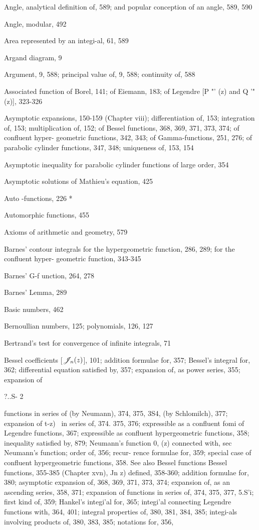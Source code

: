 Angle, analytical definition of, 589; and popular conception of an angle, 589, 590

Angle, modular, 492

Area represented by an integi-al, 61, 589

Argand diagram, 9

Argument, 9, 588; principal value of, 9, 588; continuity of, 588

Associated function of Borel, 141; of Eiemann, 183; of Legendre [P "' (z) and Q '" (z)], 323-326

Asymptotic expansions, 150-159 (Chapter viii); differentiation of, 153; integration of, 153;
multiplication of, 152; of Bessel functions, 368, 369, 371, 373, 374; of confluent hyper-
geometric functions, 342, 343; of Gamma-functions, 251, 276; of parabolic cylinder functions,
347, 348; uniqueness of, 153, 154

Asymptotic inequality for parabolic cylinder functions of large order, 354

Asymptotic solutions of Mathieu's equation, 425

Auto -functions, 226 *

Automorphic functions, 455

Axioms of arithmetic and geometry, 579

Barnes' contour integrals for the hypergeometric function, 286, 289; for the confluent hyper-
geometric function, 343-345

Barnes' G-f unction, 264, 278

Barnes' Lemma, 289

Basic numbers, 462

Bernoullian numbers, 125; polynomials, 126, 127

Bertrand's test for convergence of infinite integrals, 71

Bessel coefficients [$\mathscr{J}_{n}(z)$], 101; addition formulae for, 357; Bessel's integral for, 362;
differential equation satisfied by, 357; expansion of, as power series, 355; expansion of

?..S- 2

%
%
functions in series of (by Neumann), 374, 375, 3S4, (by Schlomilch), 377; expansion of
 t-z)~  in series of, 374. 375, 376; expressible as a confluent fomi of Legendre functions,
367; expressible as confluent hypergeometric functions, 358; inequality satisfied by, 879;
Neumann's function 0, (z) connected with, sec Neumann's function; order of, 356; recur-
rence formulae for, 359; special case of confluent hypergeometric functions, 358. See also
Bessel functions
Bessel functions, 355-385 (Chapter xvn), Jn z) defined, 358-360; addition formulae for, 380;
asymptotic expansion of, 368, 369, 371, 373, 374; expansion of, as an ascending series, 358,
371; expansion of functions in series of, 374, 375, 377, 5.S'i; first kind of, 359; Hankel's
integi'al for, 365; integi'al connecting Legendre functions with, 364, 401; integral properties
of, 380, 381, 384, 385; integi-als involving products of, 380, 383, 385; notations for, 356,

